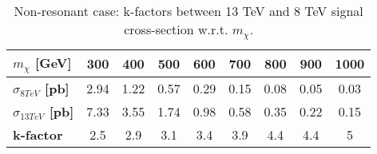 \documentclass[10pt]{article}
\begin{document}
\begin{table}[!ht]
\begin{center}
\begin{tabular}{|l|c|c|c|c|c|c|c|c|}
\hline
\hline
\textbf{$m_{\chi}$ [GeV]}          & \textbf{300} & \textbf{400} & \textbf{500} & \textbf{600} & \textbf{700} & \textbf{800} & \textbf{900} & \textbf{1000} \\
\hline
\textbf{ $\sigma_{ 8 TeV}$ [pb]}   & 2.94         & 1.22         & 0.57         & 0.29         & 0.15         & 0.08         & 0.05         & 0.03          \\
\textbf{ $\sigma_{ 13 TeV}$ [pb]}  & 7.33         & 3.55         & 1.74         & 0.98         & 0.58         & 0.35         & 0.22         & 0.15          \\
\hline                                                                     
\textbf{ k-factor}                 & 2.5          & 2.9          & 3.1          & 3.4          & 3.9          & 4.4          & 4.4          & 5             \\
\hline                                                                     
\hline                                                                     
\hline
\end{tabular}
\caption{Non-resonant case: k-factors between 13 TeV and 8 TeV signal cross-section w.r.t. $m_{\chi}$.}
\label{tab:SFtable}
\end{center}
\end{table} 
\end{document}
